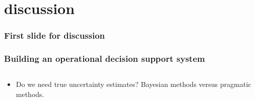 
\section{discussion}

\begin{frame}
    \frametitle{First slide for discussion}
\end{frame}








\begin{frame}
    \frametitle{Building an operational decision support system}
    \begin{columns}
        \begin{column}{0.6\textwidth}
            \begin{itemize}
                \item Do we need true uncertainty estimates? Bayesian methods versus pragmatic methods.
            \end{itemize}

        \end{column}
    \end{columns}
\end{frame}
